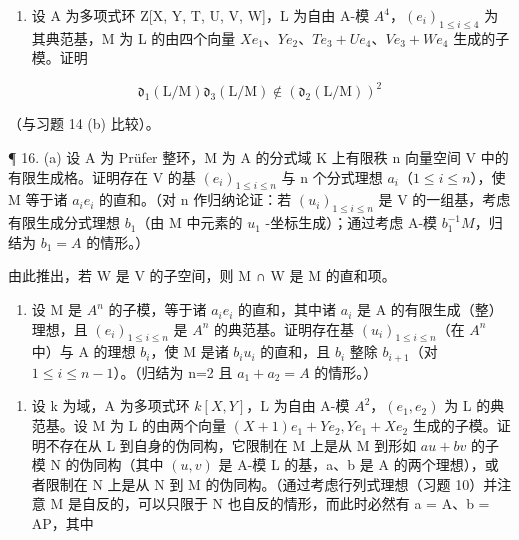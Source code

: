 \begin{enumerate}
\def\labelenumi{\arabic{enumi}.}
\setcounter{enumi}{14}
\tightlist
\item
  设 A 为多项式环 Z{[}X, Y, T, U, V, W{]}，L 为自由 A-模 \(A^{4}\)，\((e_{i})_{1 \leq i \leq 4}\) 为其典范基，M 为 L 的由四个向量 \(Xe_{1}\)、\(Ye_{2}\)、\(Te_{3} + Ue_{4}\)、\(Ve_{3} + We_{4}\) 生成的子模。证明
\end{enumerate}

\[
\mathfrak {d} _ {1} (\mathrm{L} / \mathrm{M}) \mathfrak {d} _ {3} (\mathrm{L} / \mathrm{M}) \notin (\mathfrak {d} _ {2} (\mathrm{L} / \mathrm{M})) ^ {2}
\]

（与习题 14 (b) 比较）。

¶ 16. (a) 设 A 为 Prüfer 整环，M 为 A 的分式域 K 上有限秩 n 向量空间 V 中的有限生成格。证明存在 V 的基 \((e_{i})_{1 \leqslant i \leqslant n}\) 与 n 个分式理想 \(a_{i}\)（\(1 \leqslant i \leqslant n\)），使 M 等于诸 \(a_{i}e_{i}\) 的直和。（对 n 作归纳论证：若 \((u_{i})_{1\leq i\leq n}\) 是 V 的一组基，考虑有限生成分式理想 \(b_{1}\)（由 M 中元素的 \(u_{1}\) -坐标生成）；通过考虑 A-模 \(b_{1}^{-1}M\)，归结为 \(b_{1}=A\) 的情形。）

由此推出，若 W 是 V 的子空间，则 M ∩ W 是 M 的直和项。

\begin{enumerate}
\def\labelenumi{(\alph{enumi})}
\setcounter{enumi}{1}
\tightlist
\item
  设 M 是 \(A^{n}\) 的子模，等于诸 \(a_{i}e_{i}\) 的直和，其中诸 \(a_{i}\) 是 A 的有限生成（整）理想，且 \((e_{i})_{1\leqslant i\leqslant n}\) 是 \(A^{n}\) 的典范基。证明存在基 \((u_{i})_{1\leqslant i\leqslant n}\)（在 \(A^{n}\) 中）与 A 的理想 \(b_{i}\)，使 M 是诸 \(b_{i}u_{i}\) 的直和，且 \(b_{i}\) 整除 \(b_{i+1}\)（对 \(1\leqslant i\leqslant n-1\)）。（归结为 n=2 且 \(a_{1}+a_{2}=A\) 的情形。）
\end{enumerate}

\begin{enumerate}
\def\labelenumi{\arabic{enumi}.}
\setcounter{enumi}{16}
\tightlist
\item
  设 k 为域，A 为多项式环 \(k[X, Y]\)，L 为自由 A-模 \(A^{2}\)，\((e_{1}, e_{2})\) 为 L 的典范基。设 M 为 L 的由两个向量 \((X + 1)e_{1} + Ye_{2}, Ye_{1} + Xe_{2}\) 生成的子模。证明不存在从 L 到自身的伪同构，它限制在 M 上是从 M 到形如 \(au + bv\) 的子模 N 的伪同构（其中 \((u, v)\) 是 A-模 L 的基，a、b 是 A 的两个理想），或者限制在 N 上是从 N 到 M 的伪同构。（通过考虑行列式理想（习题 10）并注意 M 是自反的，可以只限于 N 也自反的情形，而此时必然有 a = A、b = AP，其中
\end{enumerate}

